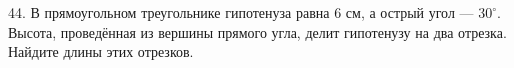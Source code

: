 44. В прямоугольном треугольнике гипотенуза равна 6 см, а острый угол --- $30^\circ.$ Высота, проведённая из вершины прямого угла, делит гипотенузу на два отрезка. Найдите длины этих отрезков.\\
